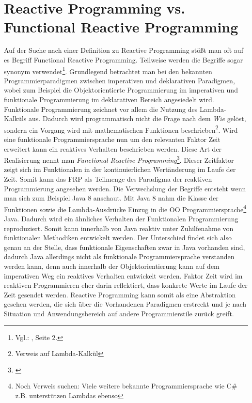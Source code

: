 \section{Reactive Programming vs. Functional Reactive Programming}
Auf der Suche nach einer Definition zu Reactive Programming stößt man oft auf es Begriff Functional Reactive Programming. Teilweise werden die Begriffe sogar synonym verwendet\footnote{Vgl.: \cite{Nurkiewicz.2017}, Seite 2.}. Grundlegend betrachtet man bei den bekannten Programmierparadigmen zwischen imperativen und deklarativen Paradigmen, wobei zum Beispiel die Objektorientierte Programmierung im imperativen und funktionale Programmierung im deklarativen Bereich angesiedelt wird. Funktionale Programmierung zeichnet vor allem die Nutzung des Lambda-Kalküls aus. Dadurch wird programmatisch nicht die Frage nach dem \textit{Wie} gelöst, sondern ein Vorgang wird mit mathematischen Funktionen beschrieben\footnote{Verweis auf Lambda-Kalkül}. Wird eine funktionale Programmiersprache nun um den relevanten Faktor Zeit erweitert kann ein reaktives Verhalten beschrieben werden. Diese Art der Realisierung nennt man \textit{Functional Reactive Programming}\footnote{\cite{frp.haskell}}. Dieser Zeitfaktor zeigt sich im Funktionalen in der kontinuierlichen Wertänderung im Laufe der Zeit. Somit kann das FRP als Teilmenge des Paradigma der reaktiven Programmierung angesehen werden. Die Verwechslung der Begriffe entsteht wenn man sich zum Beispiel Java 8 anschaut. Mit Java 8 nahm die Klasse der Funktionen sowie die Lambda-Ausdrücke Einzug in die OO Programmiersprache\footnote{Noch Verweis suchen: Viele weitere bekannte Programmiersprache wie C\# z.B. unterstützen Lambdas ebenso} Java. Dadurch wird ein ähnliches Verhalten der Funktionalen Programmierung reproduziert. Somit kann innerhalb von Java reaktiv unter Zuhilfenahme von funktionalen Methodiken entwickelt werden. Der Unterschied findet sich also genau an der Stelle, dass funktionale Eigenschaften zwar in Java vorhanden sind, dadurch Java allerdings nicht als funktionale Programmiersprache verstanden werden kann, denn auch innerhalb der Objektorientierung kann auf dem imperativen Weg ein reaktives Verhalten entwickelt werden. Faktor Zeit wird im reaktiven Programmieren eher darin reflektiert, dass konkrete Werte im Laufe der Zeit gesendet werden. Reactive Programming kann somit als eine Abstraktion gesehen werden, die sich über die Vorhandenen Paradigmen erstreckt und je nach Situation und Anwendungsbereich auf andere Programmierstile zurück greift. 

